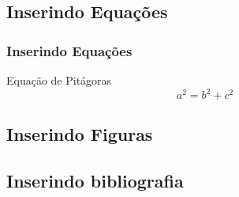 \documentclass[12pt, xcolor=table, aspectratio=169]{beamer}
\makeatletter
\newcommand*{\currentname}{\@currentlabelname}
\makeatother
\begin{document}
\subsection{Inserindo Equações}

\begin{frame}
 \frametitle{Inserindo Equações}
 \begin{block}{Equação de Pitágoras}
   \begin{equation*}
     a^2 = b^2 + c^2
   \end{equation*}
 \end{block}
\end{frame}


\subsection{Inserindo Figuras}

\begin{frame}
  \frametitle{\currentname}
\end{frame}


\subsection{Inserindo bibliografia}
\begin{frame}
  \frametitle{\currentname}
\end{frame}
\end{document}
